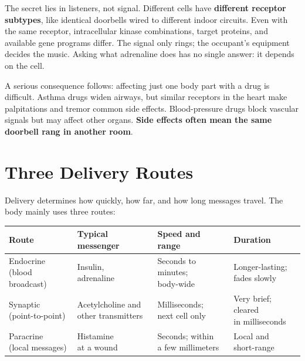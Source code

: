 The secret lies in listeners, not signal. Different cells have \textbf{different receptor subtypes}, like identical doorbells wired to different indoor circuits. Even with the same receptor, intracellular kinase combinations, target proteins, and available gene programs differ. The signal only rings; the occupant's equipment decides the music. Asking what adrenaline does has no single answer: it depends on the cell.

A serious consequence follows: affecting just one body part with a drug is difficult. Asthma drugs widen airways, but similar receptors in the heart make palpitations and tremor common side effects. Blood-pressure drugs block vascular signals but may affect other organs. \textbf{Side effects often mean the same doorbell rang in another room}.

\section{Three Delivery Routes}

Delivery determines how quickly, how far, and how long messages travel. The body mainly uses three routes:

\begin{table}[htbp]
\centering
\begin{tabular}{llll}
\toprule
Route & Typical messenger & Speed and range & Duration \\
\midrule
\shortstack[l]{Endocrine\\(blood broadcast)} & \shortstack[l]{Insulin,\\adrenaline} & \shortstack[l]{Seconds to minutes;\\body-wide} & \shortstack[l]{Longer-lasting;\\fades slowly} \\
\shortstack[l]{Synaptic\\(point-to-point)} & \shortstack[l]{Acetylcholine and\\other transmitters} & \shortstack[l]{Milliseconds;\\next cell only} & \shortstack[l]{Very brief; cleared\\in milliseconds} \\
\shortstack[l]{Paracrine\\(local messages)} & \shortstack[l]{Histamine\\at a wound} & \shortstack[l]{Seconds; within\\a few millimeters} & \shortstack[l]{Local and\\short-range} \\
\bottomrule
\end{tabular}
\end{table}

